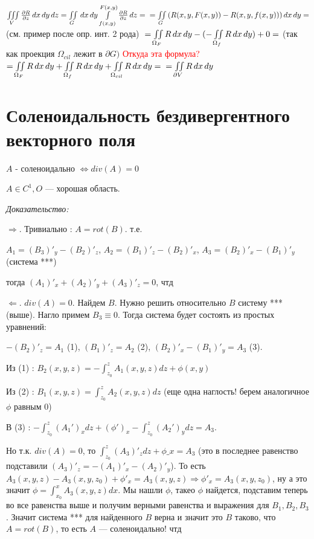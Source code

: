 \documentclass[paper=a4, fontsize=17pt]{article}
\begin{document}
$\iiint\limits_{V}{\frac {\partial R}{\partial z} \,dx\,dy\,dz}
= \iint\limits_G\,dx\,dy\int\limits_{f(x,y)}^{F(x,y)} {\frac {\partial R}{\partial z} \,dz} = \\
= \iint\limits_G{(R(x,y, F(x,y)) - R(x, y, f(x,y)))\,dx\,dy} = $ (см. пример после опр. инт. 2 рода) $\\
= \iint\limits_{\Omega_F}{R\,dx\,dy} - (-\iint\limits_{\Omega_f}{R\,dx\,dy}) + 0  = $ (так как проекция $\Omega_{cil}$ лежит в $\partial G )$ \textcolor{red}{Откуда эта формула?}\\
$= \iint\limits_{\Omega_F}{R\,dx\,dy} + \iint\limits_{\Omega_f}{R\,dx\,dy} + \iint\limits_{\Omega_{cil}}{R\,dx\,dy} = \\
= \iint\limits_{\partial V}{R\,dx\,dy}$

\section{Соленоидальность бездивергентного векторного поля}

$A$ - соленоидально $ \Leftrightarrow div(A) = 0 $

$A \in C^1, O $ --- хорошая область.

\emph{Доказательство:}

$\Rightarrow $. Тривиально : $A = rot(B)$. т.е. 

$A_1 = (B_3)'_y - (B_2)'_z$, $A_2 = (B_1)'_z - (B_2)'_x$, $A_3 = (B_2)'_x - (B_1)'_y$ (система ***)

тогда $(A_1)'_x + (A_2)'_y + (A_3)'_z = 0$, чтд

$\Leftarrow $. $div(A) = 0$. Найдем $B$. Нужно решить относительно $B$ систему *** (выше). Нагло примем $B_3 \equiv 0$. Тогда система будет состоять из простых уравнений:

$-(B_2)'_z = A_1$ (1), $(B_1)'_z = A_2$ (2), $(B_2)'_x - (B_1)'_y = A_3$ (3). 

Из (1) : $B_2(x, y, z) = - \int_{z_0}^{z} A_1(x, y, z)dz + \phi(x, y)$

Из (2) : $B_1(x, y, z) = \int_{z_0}^{z} A_2(x, y, z)dz$ (еще одна наглость! берем аналогичное $\phi$ равным $0$)

В (3) : $- \int_{z_0}^{z} (A_{1}')_{x} dz + (\phi')_x - \int_{z_0}^{z} (A_{2}')_{y} dz = A_3$.

Но т.к. $div(A) = 0$, то $\int_{z_0}^{z} (A_3)'_z dz + \phi\_x = A_3$ (это в последнее равенство подставили $(A_3)'_z = -(A_1)'_x - (A_2)'_y$). То есть $A_3(x, y, z) - A_3(x, y, z_0) + \phi'_x = A_3(x, y, z) \Rightarrow \phi'_x = A_3(x, y, z_0)$, ну а это значит $\phi = \int_{x_0}^{x} A_3(x, y, z)dx$. Мы нашли $\phi$, такео $\phi$ найдется, подставим теперь во все равенства выше и получим верными равенства и выражения для $B_1, B_2, B_3$. Значит система *** для найденного $B$ верна и значит это $B$ таково, что $A = rot(B)$, то есть $A$ --- соленоидально! чтд
\end{document}
